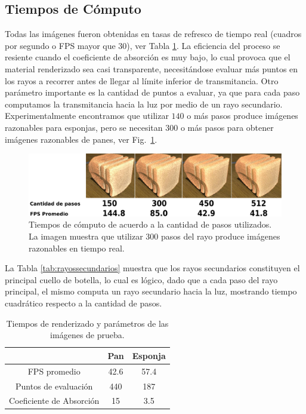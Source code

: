 \subsection*{Tiempos de Cómputo}

Todas las imágenes fueron obtenidas en tasas de refresco de tiempo real (cuadros por segundo o \acrshort{FPS} mayor que $30$), ver Tabla \ref{tab:tiemposrenderizado}.
La eficiencia del proceso se resiente cuando el coeficiente de absorción es muy bajo, lo cual provoca que el material renderizado sea casi transparente, necesitándose evaluar más puntos en los rayos a recorrer antes de llegar al límite inferior de transmitancia.
Otro parámetro importante es la cantidad de puntos a evaluar, ya que para cada paso computamos la transmitancia hacia la luz por medio de un rayo secundario.
Experimentalmente encontramos que utilizar $140$ o más pasos produce imágenes razonables para esponjas, pero se necesitan $300$ o más pasos para obtener imágenes razonables de panes, ver Fig.~\ref{fg:stepcount}.


\begin{figure}
  \centerline{\includegraphics[width=13cm]{figures/stepcount}}
  \caption[Tiempos de cómputo de acuerdo a la cantidad de pasos utilizados]{Tiempos de cómputo de acuerdo a la cantidad de pasos utilizados. La imagen muestra que utilizar $300$ pasos del rayo produce imágenes razonables en tiempo real.}
  \label{fg:stepcount}
\end{figure}

La Tabla \ref{tab:rayossecundarios} muestra que los rayos secundarios constituyen el principal cuello de botella, lo cual es lógico, dado que a cada paso del rayo principal, el mismo computa un rayo secundario hacia la luz, mostrando tiempo cuadrático respecto a la cantidad de pasos.


\begin{table}[htb]
\centering
\begin{tabular}{|c|c|c|}
\hline &  Pan & Esponja \\
\hline
\hline
 FPS promedio & 42.6 & 57.4\\
\hline
 Puntos de evaluación &  440  & 187 \\
\hline
 Coeficiente de Absorción &  15  & 3.5 \\
\hline
\end{tabular}
\caption{Tiempos de renderizado y parámetros de las imágenes de prueba.}
\label{tab:tiemposrenderizado}
\end{table}

